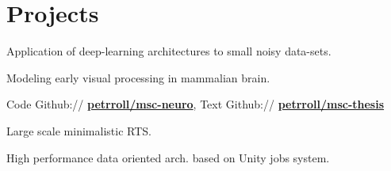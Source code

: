 \documentclass[a4paper]{deedy-resume} %
\begin{document}
\begin{minipage}[t]{0.62\textwidth}
\section{Projects}


\emptyLocation %
\begin{tightitemize}
\item Application of deep-learning architectures to small noisy data-sets.
\item Modeling early visual processing in mammalian brain.
\item Code Github:// \href{https://github.com/petrroll/msc-neuro}{\bf petrroll/msc-neuro}, Text Github:// \href{https://github.com/petrroll/msc-thesis}{\bf petrroll/msc-thesis}
\end{tightitemize}

\halfsectionspace %





\emptyLocation %
\begin{tightitemize}
\item Large scale minimalistic RTS.
\item High performance data oriented arch. based on Unity jobs system.
\end{tightitemize}


\end{minipage}
\end{document}
